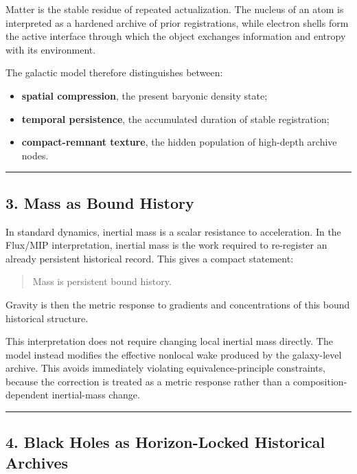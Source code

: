 \documentclass[
]{article}
\providecommand{\tightlist}{%
  \setlength{\itemsep}{0pt}\setlength{\parskip}{0pt}}
\begin{document}
Matter is the stable residue of repeated actualization. The nucleus of
an atom is interpreted as a hardened archive of prior registrations,
while electron shells form the active interface through which the object
exchanges information and entropy with its environment.

The galactic model therefore distinguishes between:

\begin{itemize}
\tightlist
\item
  \textbf{spatial compression}, the present baryonic density state;
\item
  \textbf{temporal persistence}, the accumulated duration of stable
  registration;
\item
  \textbf{compact-remnant texture}, the hidden population of high-depth
  archive nodes.
\end{itemize}

\begin{center}\rule{0.5\linewidth}{0.5pt}\end{center}

\subsection{3. Mass as Bound History}\label{mass-as-bound-history}

In standard dynamics, inertial mass is a scalar resistance to
acceleration. In the Flux/MIP interpretation, inertial mass is the work
required to re-register an already persistent historical record. This
gives a compact statement:

\begin{quote}
Mass is persistent bound history.
\end{quote}

Gravity is then the metric response to gradients and concentrations of
this bound historical structure.

This interpretation does not require changing local inertial mass
directly. The model instead modifies the effective nonlocal wake
produced by the galaxy-level archive. This avoids immediately violating
equivalence-principle constraints, because the correction is treated as
a metric response rather than a composition-dependent inertial-mass
change.

\begin{center}\rule{0.5\linewidth}{0.5pt}\end{center}

\subsection{4. Black Holes as Horizon-Locked Historical
Archives}\label{black-holes-as-horizon-locked-historical-archives}
\end{document}
